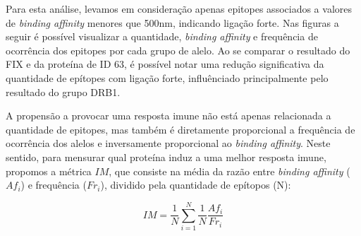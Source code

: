 Para esta análise, levamos em consideração apenas epitopes associados a valores de \textit{binding affinity} 
menores que 500nm, indicando ligação forte. 
Nas figuras a seguir é possível visualizar a quantidade, \textit{binding affinity} e frequência de ocorrência 
dos epitopes por cada grupo de alelo. Ao se comparar o resultado do FIX e da proteína de ID 63,
é possível notar uma redução significativa da quantidade de epítopes com ligação forte, influênciado principalmente 
pelo resultado do grupo DRB1. 

\begin{figure}%
    \centering
    \qquad
\end{figure}

A propensão a provocar uma resposta imune não está apenas relacionada a quantidade de epitopes, 
mas também é diretamente proporcional a frequência de ocorrência dos alelos e inversamente proporcional 
ao \textit{binding affinity}. Neste sentido, para mensurar qual proteína induz a uma melhor resposta imune, propomos a 
métrica $IM$, que consiste na média da razão entre \textit{binding affinity} (${Af}_{i}$) 
e frequência ($Fr_{i}$), 
dividido pela quantidade de epítopos (N):

\begin{equation}
    IM = \frac{1}{N} \sum_{i=1}^{N} \frac{1}{N} \frac{{Af}_{i}}{Fr_{i}}
\end{equation}

